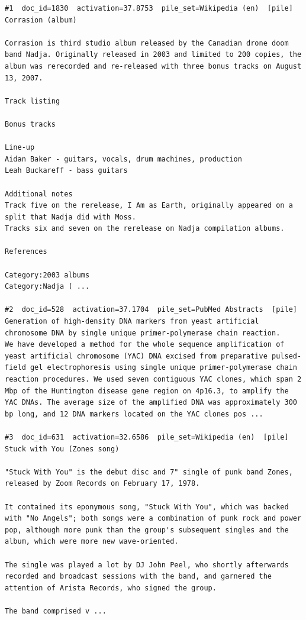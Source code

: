 \begin{verbatim}
#1  doc_id=1830  activation=37.8753  pile_set=Wikipedia (en)  [pile]
Corrasion (album)

Corrasion is third studio album released by the Canadian drone doom band Nadja. Originally released in 2003 and limited to 200 copies, the album was rerecorded and re-released with three bonus tracks on August 13, 2007.

Track listing

Bonus tracks

Line-up
Aidan Baker - guitars, vocals, drum machines, production
Leah Buckareff - bass guitars

Additional notes
Track five on the rerelease, I Am as Earth, originally appeared on a split that Nadja did with Moss.
Tracks six and seven on the rerelease on Nadja compilation albums.

References

Category:2003 albums
Category:Nadja ( ...

#2  doc_id=528  activation=37.1704  pile_set=PubMed Abstracts  [pile]
Generation of high-density DNA markers from yeast artificial chromosome DNA by single unique primer-polymerase chain reaction.
We have developed a method for the whole sequence amplification of yeast artificial chromosome (YAC) DNA excised from preparative pulsed-field gel electrophoresis using single unique primer-polymerase chain reaction procedures. We used seven contiguous YAC clones, which span 2 Mbp of the Huntington disease gene region on 4p16.3, to amplify the YAC DNAs. The average size of the amplified DNA was approximately 300 bp long, and 12 DNA markers located on the YAC clones pos ...

#3  doc_id=631  activation=32.6586  pile_set=Wikipedia (en)  [pile]
Stuck with You (Zones song)

"Stuck With You" is the debut disc and 7" single of punk band Zones, released by Zoom Records on February 17, 1978.

It contained its eponymous song, "Stuck With You", which was backed with "No Angels"; both songs were a combination of punk rock and power pop, although more punk than the group's subsequent singles and the album, which were more new wave-oriented.

The single was played a lot by DJ John Peel, who shortly afterwards recorded and broadcast sessions with the band, and garnered the attention of Arista Records, who signed the group.

The band comprised v ...


\end{verbatim}
